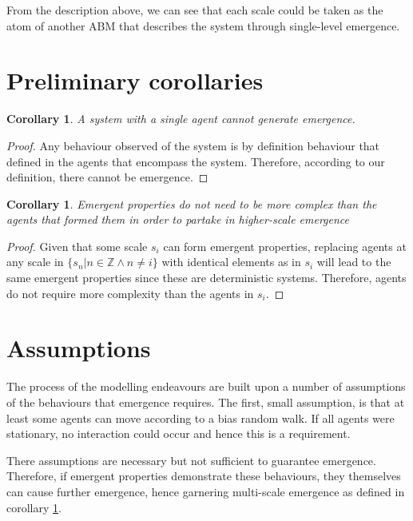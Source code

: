 \documentclass{article}
\newtheorem{corollary}[theorem]{Corollary}
\begin{document}
  From the description above, we can see that each scale could be taken as the atom of another ABM that describes the system through single-level emergence.



\section{Preliminary corollaries}

  \begin{corollary}
    A system with a single agent cannot generate emergence.
  \label{col:single_agent}
  \end{corollary}
  \begin{proof}

    Any behaviour observed of the system is by definition behaviour that defined in the agents that encompass the system. Therefore, according to our definition, there cannot be emergence. 

  \end{proof}


  \begin{corollary}
    Emergent properties do not need to be more complex than the agents that formed them in order to partake in higher-scale emergence
    \label{col:emer_level}
  \end{corollary}
  \begin{proof}

    Given that some scale $s_i$ can form emergent properties, replacing agents at any scale in $\{s_n | n \in \mathbb{Z} \wedge n \not = i \}$ with identical elements as in $s_i$ will lead to the same emergent properties since these are deterministic systems. Therefore, agents do not require more complexity than the agents in $s_i$.

  \end{proof}


\section{Assumptions}

  The process of the modelling endeavours are built upon a number of assumptions of the behaviours that emergence requires. The first, small assumption, is that at least some agents can move according to a bias random walk. If all agents were stationary, no interaction could occur and hence this is a requirement.

  There assumptions are necessary but not sufficient to guarantee emergence. Therefore, if emergent properties demonstrate these behaviours, they themselves can cause further emergence, hence garnering multi-scale emergence as defined in corollary \ref{col:emer_level}. 
\end{document}
